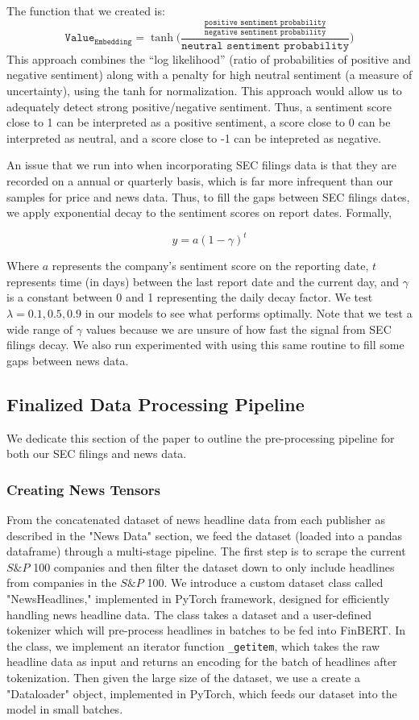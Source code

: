 The function that we created is:
\[\texttt{Value}_{\texttt{Embedding}} = \tanh\Biggl( \frac{\frac{\texttt{positive sentiment probability}}{\texttt{negative sentiment probability}}}{\texttt{neutral sentiment probability}} \Biggr)\]
This approach combines the “log likelihood” (ratio of probabilities of positive and 
negative sentiment) along with a penalty for high neutral sentiment (a measure of 
uncertainty), using the tanh for normalization. This approach would allow us to 
adequately detect strong positive/negative sentiment. Thus, a sentiment score close to 1 can be interpreted as a positive sentiment, a score close to 0 can be interpreted as neutral, and a score close to -1 can be intepreted as negative.

An issue that we run into when incorporating SEC filings data is that they are recorded on a annual or quarterly basis, which is far more infrequent than our samples for price and news data.
Thus, to fill the gaps between SEC filings dates, we apply exponential decay to the sentiment scores on report dates. Formally,

$$
y = a(1 - \gamma)^t
$$

Where $a$ represents the company's sentiment score on the reporting date, $t$ represents time (in days) between the last report date and the current day, and $\gamma$ is a constant between 0 and 1 representing the daily decay factor. We test $\lambda = 0.1, 0.5, 0.9$ in our models to see what performs optimally. Note that we test a wide range of $\gamma$ values because we are unsure of how fast the signal from SEC filings decay. We also run experimented with using this same routine to fill some gaps between news data.
 
\subsection{Finalized Data Processing Pipeline}
We dedicate this section of the paper to outline the pre-processing pipeline for both our SEC filings and news data.

\subsubsection{Creating News Tensors}

From the concatenated dataset of news headline data from each publisher as described in the "News Data" section, we feed the dataset (loaded into a pandas dataframe) through a multi-stage pipeline. 
The first step is to scrape the current $S\&P$ 100 companies and then filter the dataset down to only include headlines from companies in the $S\&P$ 100. 
We introduce a custom dataset class called "NewsHeadlines," implemented in PyTorch framework, designed for efficiently handling news headline data. 
The class takes a dataset and a user-defined tokenizer which will pre-process headlines in batches to be fed into FinBERT. 
In the class, we implement an iterator function \texttt{\_getitem}, which takes the raw headline data as input and returns an encoding for the batch of headlines after tokenization. 
Then given the large size of the dataset, we use a create a "Dataloader" object, implemented in PyTorch, which feeds our dataset into the model in small batches. 

